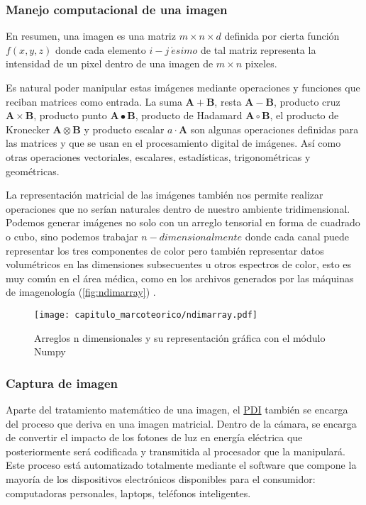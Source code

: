 \subsubsection{Manejo computacional de una imagen}

En resumen, una imagen es una matriz \(m \times n \times d\) definida por cierta
función \(f(x,y,z)\) donde cada elemento \(i-j~\acute{e}simo\) de tal matriz
representa la intensidad de un pixel dentro de una imagen de \(m \times n \)
pixeles. 

Es natural poder manipular estas imágenes mediante operaciones y funciones que
reciban matrices como entrada. La suma \(\mathbf{A} + \mathbf{B}\), resta
\(\mathbf{A} - \mathbf{B}\), producto cruz \(\mathbf{A} \times \mathbf{B}\),
producto punto \(\mathbf{A} \bullet \mathbf{B}\),  producto de Hadamard
\(\mathbf{A} \circ \mathbf{B}\), el producto de Kronecker \(\mathbf{A} \otimes
\mathbf{B}\) y producto escalar \(a \cdot \mathbf{A}\) son algunas operaciones
definidas para las matrices y que se usan en el procesamiento digital de
imágenes. Así como otras operaciones vectoriales, escalares, estadísticas,
trigonométricas y geométricas.

La representación matricial de las imágenes también nos permite realizar
operaciones que no serían naturales dentro de nuestro ambiente tridimensional.
Podemos generar imágenes no solo con un arreglo tensorial en forma de cuadrado o
cubo, sino podemos trabajar \(n-dimensionalmente\) donde cada canal puede
representar los tres componentes de color pero también representar datos
volumétricos en las dimensiones subsecuentes u otros espectros de color, esto es
muy común en el área médica, como en los archivos generados por las máquinas de
imagenología (\autoref{fig:ndimarray}) \cite{Toennies2012}. 

\begin{figure}[H]
    \centering
    \texttt{[image: capitulo\_marcoteorico/ndimarray.pdf]}
    \caption{Arreglos n dimensionales y su representación gráfica con el módulo Numpy}\label{fig:ndimarray}
\end{figure}

\subsubsection{Captura de imagen}

Aparte del tratamiento matemático de una imagen, el \hyperlink{abbr}{PDI}
también se encarga del proceso que deriva en una imagen matricial. Dentro de la
cámara, se encarga de convertir el impacto de los fotones de luz en energía
eléctrica que posteriormente será codificada y transmitida al procesador que la
manipulará. Este proceso está automatizado totalmente mediante el software que
compone la mayoría de los dispositivos electrónicos disponibles para el
consumidor: computadoras personales, laptops, teléfonos inteligentes.

